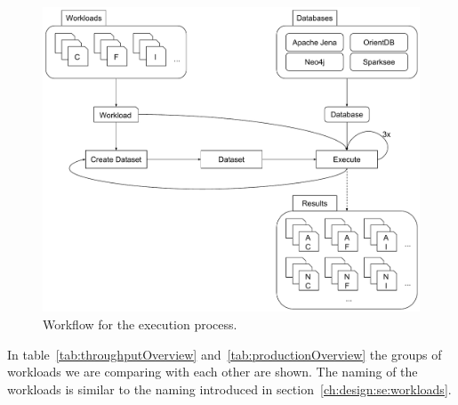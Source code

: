 \begin{figure}[!h]
  \includegraphics[width=\textwidth]{images/executionWorkflow}
  \caption{Workflow for the execution process.}
  \label{fig:executionWorkflow}
\end{figure}

In table~\ref{tab:throughputOverview} and~\ref{tab:productionOverview} the groups of workloads we are comparing with each other are shown.
The naming of the workloads is similar to the naming introduced in section~\ref{ch:design:se:workloads}.


